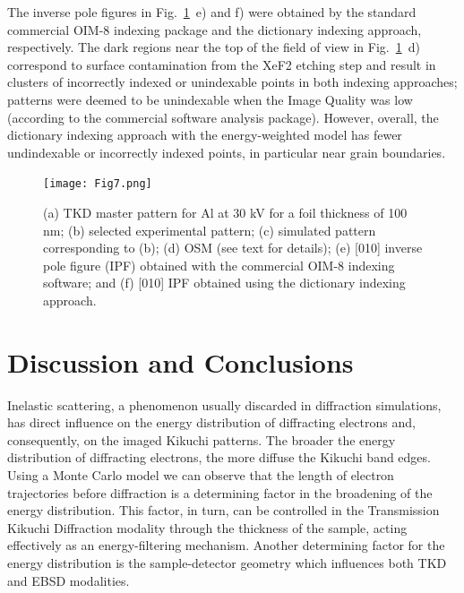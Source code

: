 The \hkl[010] inverse pole figures in Fig.~\ref{fig:TKDindex}~e) and f) were obtained by the standard commercial OIM-8 indexing package and the dictionary indexing approach, respectively. The dark regions near the top of the field of view in Fig.~\ref{fig:TKDindex}~d) correspond to surface contamination from the XeF2 etching step and result in clusters of incorrectly indexed or unindexable points in both indexing approaches; patterns were deemed to be unindexable when the Image Quality was low (according to the commercial software analysis package). However, overall, the dictionary indexing approach with the energy-weighted model has fewer undindexable or incorrectly indexed points, in particular near grain boundaries.

\begin{figure}[t]
\centering
\texttt{[image: Fig7.png]}
\caption[Dictionary indexing TKD pattern]{ (a) TKD master pattern for Al at 30 kV for a foil thickness of 100 nm; (b) selected experimental pattern; (c) simulated pattern corresponding to (b); (d) OSM (see text for details); (e) [010] inverse pole figure (IPF) obtained with the commercial OIM-8 indexing software; and (f) [010] IPF obtained using the dictionary indexing approach. }
\label{fig:TKDindex}
\end{figure}


%
\section{Discussion and Conclusions \label{sec:discussion}}

Inelastic scattering, a phenomenon usually discarded in diffraction simulations, has direct influence on the energy distribution of diffracting electrons and, consequently, on the imaged Kikuchi patterns. The broader the energy distribution of diffracting electrons, the more diffuse the Kikuchi band edges. Using a Monte Carlo model we can observe that the length of electron trajectories before diffraction is a determining factor in the broadening of the energy distribution. This factor, in turn, can be controlled in the Transmission Kikuchi Diffraction modality through the thickness of the sample, acting effectively as an energy-filtering mechanism. Another determining factor for the energy distribution is the sample-detector geometry which influences both TKD and EBSD modalities.



